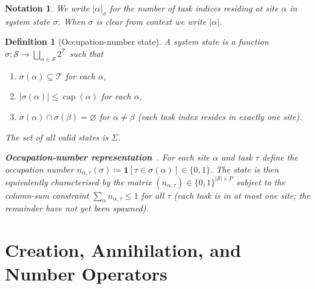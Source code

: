 \documentclass[11pt,a4paper]{report}
\newtheorem{definition}{Definition}[section]
\newtheorem{notation}{Notation}[section]
\begin{document}
\begin{notation}
We write $|\alpha|_\sigma$ for the number of task indices residing at
site $\alpha$ in system state $\sigma$.  When $\sigma$ is clear from
context we write $|\alpha|$.
\end{notation}

\begin{definition}[Occupation-number state]
\label{def:state}
A \emph{system state} is a function
$\sigma : \mathcal{S} \to \bigsqcup_{\alpha \in \mathcal{S}} 2^{\mathcal{T}}$
such that
\begin{enumerate}
  \item $\sigma(\alpha) \subseteq \mathcal{T}$ for each $\alpha$,
  \item $|\sigma(\alpha)| \leq \operatorname{cap}(\alpha)$ for each $\alpha$,
  \item $\sigma(\alpha) \cap \sigma(\beta) = \varnothing$ for $\alpha \neq \beta$
        (each task index resides in \emph{exactly one} site).
\end{enumerate}
The set of all valid states is $\Sigma$.

\medskip\noindent
\textbf{Occupation-number representation}~\cite{fock1932,landau_qm}.
For each site $\alpha$ and task $\tau$ define the occupation number
$n_{\alpha,\tau}(\sigma) \coloneqq \mathbf{1}[\tau \in \sigma(\alpha)]
\in \{0,1\}$.
The state is then equivalently characterised by the matrix
$(n_{\alpha,\tau}) \in \{0,1\}^{|\mathcal{S}|\times P}$ subject to
the column-sum constraint $\sum_{\alpha} n_{\alpha,\tau} \leq 1$ for
all $\tau$ (each task is in at most one site; the remainder have not
yet been spawned).
\end{definition}

\section{Creation, Annihilation, and Number Operators}
\end{document}
